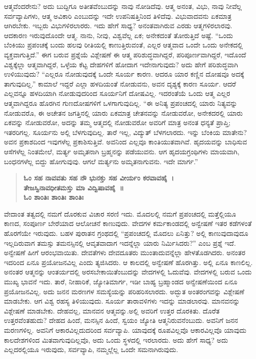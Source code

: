 ಆತ್ಮವೆಂದರೇನು? ಅದು ಬುದ್ದಿಗೂ ಅತೀತವೆಂಬುದನ್ನು ನಾವು ನೋಡಿದೆವು. ಆತ್ಮ ಅನಂತ, ವಿಭು, ನಾವು ನೀವೆಲ್ಲ ಸರ್ವವ್ಯಾಪಿಗಳು, ಆತ್ಮ ಅವಿಕಾರಿ ಎಂಬುದನ್ನು ಇದೇ ಉಪನಿಷತ್ತಿನಿಂದ ತಿಳಿದೆವು. ವಿಭುವಾದವನು ಏಕಮಾತ್ರ ಆಗಿರಬೇಕು. ಇಬ್ಬರು ವಿಭುಗಳಿರಲಾರರು. ಇದು ಹೇಗೆ ಸಾಧ್ಯ? ಅನಂತವಾಗಿರುವ ಎರಡು ಆತ್ಮಗಳಿರಲಾರವು. ಆದಕಾರಣ ಇರುವುದೊಂದೇ ಆತ್ಮ. ನಾನು, ನೀವು, ವಿಶ್ವವೆಲ್ಲ ಏಕ; ಅನೇಕದಂತೆ ತೋರುತ್ತಿದೆ ಅಷ್ಟೆ. “ಒಂದು ಬೆಂಕಿಯು ಪ್ರಪಂಚಕ್ಕೆ ಬಂದು ಹಲವು ರೀತಿಯಲ್ಲಿ ಕಾಣುತ್ತಿರುವಂತೆ, ಎಲ್ಲರ ಆತ್ಮವಾದ ಒಂದೇ ಒಂದು ಅನೇಕದಲ್ಲಿ ವ್ಯಕ್ತವಾಗುತ್ತಿದೆ.” ಈಗ ಬರುವ ಪ್ರಶ್ನೆಯೆ ವಿಶ್ಲೇಷಣೆ ಈ ಆತ್ಮ ಪರಿಶುದ್ಧವಾಗಿದ್ದರೆ, ಪರಿಪೂರ್ಣವಾಗಿದ್ದರೆ, ಇದೊಂದೆ ವಿಶ್ವಕ್ಕೆಲ್ಲಾ ಆತ್ಮವಾಗಿದ್ದರೆ, ಒಳ್ಳೆಯ ಕೆಟ್ಟ ದೇಹಗಳಿಗೆ ಹೋದಾಗ ಇದೇನಾಗುವುದು? ಅದು ಹೇಗೆ ಪರಿಶುದ್ಧವಾಗಿ ಉಳಿಯುವುದು? “ಎಲ್ಲರೂ ನೋಡುವುದಕ್ಕೆ ಒಂದೇ ಸೂರ್ಯ ಕಾರಣ. ಆದರೂ ಯಾರ ಕಣ್ಣಿನ ದೋಷವೂ ಅದಕ್ಕೆ ತಾಗುವುದಿಲ್ಲ.” ಕಾಮಾಲೆ ಇದ್ದರೆ ಎಲ್ಲಾ ಹಳದಿಯಂತೆ ನೋಡುವನು, ಅವನ ದೃಶ್ಯಕ್ಕೆ ಕಾರಣ ಸೂರ್ಯ. ಆದರೆ ಎಲ್ಲವನ್ನೂ ಹಳದಿಯಾಗಿ ನೋಡುವುದರಿಂದ ಸೂರ್ಯನಿಗೆ ದೋಷವಿಲ್ಲ. ಇದರಂತೆಯೆ ಒಂದು ಆತ್ಮ ಎಲ್ಲರ ಆತ್ಮವಾಗಿದ್ದರೂ ಹೊರಗಿನ ಗುಣದೋಷಗಳಿಗೆ ಒಳಗಾಗುವುದಿಲ್ಲ. “ಈ ಅನಿತ್ಯ ಪ್ರಪಂಚದಲ್ಲಿ ಯಾರು ನಿತ್ಯವನ್ನು ನೋಡುವರೊ, ಈ ಅಚೇತನ ಜಗತ್ತಿನಲ್ಲಿ ಯಾರು ಏಕಮಾತ್ರ ಚೇತನವನ್ನು ನೋಡುವರೋ, ಅನೇಕದರಲ್ಲಿ ಯಾರು ಏಕವನ್ನು ನೋಡುವರೋ, ಅದನ್ನು ತಮ್ಮ ಆತ್ಮದಲ್ಲಿ ನೋಡುವರೋ ಅವರಿಗೆ ಮಾತ್ರ ಅನಂತ ಧನ್ಯತೆ ಪ್ರಾಪ್ತಿ; ಇತರರಿಗಲ್ಲ. ಸೂರ್ಯನು ಅಲ್ಲಿ ಬೆಳಗುವುದಿಲ್ಲ. ತಾರೆ ಇಲ್ಲ, ವಿದ್ಯುತ್ ಬೆಳಗಲಾರದು. ಇನ್ನು ಬೆಂಕಿಯ ಮಾತೇನು? ಅವನ ಪ್ರಕಾಶದಿಂದ ಇವುಗಳೆಲ್ಲ ಪ್ರಕಾಶಿಸುತ್ತಿವೆ. ಅವನಿಂದ ಎಲ್ಲವೂ ಕಾಂತಿಯುತವಾಗಿವೆ. ಹೃದಯವನ್ನು ಬಾಧಿಸುವ ಆಸೆಗಳೆಲ್ಲ ನಿಂತಮೇಲೆ, ಮರ್ತ್ಯ ಅಮೃತನಾಗಿ ಬ್ರಹ್ಮನನ್ನು ಪಡೆಯುವನು. ಆಗ ಹೃದಯಗ್ರಂಥಿಗಳು ಮಾಯವಾಗಿ, ಬಂಧನಗಳೆಲ್ಲ ಬಿದ್ದು ಹೋಗುವುವು. ಆಗಲೆ ಮರ್ತ್ಯನು ಅಮೃತನಾಗುವನು. ಇದೇ ಮಾರ್ಗ.”

\begin{verse}
\textbf{ಓಂ ಸಹ ನಾವವತು ಸಹ ನೌ ಭುನಕ್ತು ಸಹ ವೀರ್ಯಂ ಕರವಾವಹೈ~।\\ತೇಜಸ್ವಿನಾವಧೀತಮಸ್ತು ಮಾ ವಿದ್ವಿಷಾವಹೈ~॥\\ಓಂ ಶಾಂತಿಃ ಶಾಂತಿಃ ಶಾಂತಿಃ }
\end{verse}

ವೇದಾಂತ ತತ್ವದಲ್ಲಿ ನಮಗೆ ದೊರಕುವ ವಿಚಾರ ಸರಣಿ ಇದು. ಮೊದಲಲ್ಲಿ ನಮಗೆ ಪ್ರಪಂಚದಲ್ಲಿ ಮತ್ತೆಲ್ಲಿಯೂ ಕಾಣದ, ಸಂಪೂರ್ಣ ಬೇರೆಯಾದ ಆಲೋಚನೆ ಕಾಣುವುದು. ವೇದಗಳ ಕರ್ಮಕಾಂಡದಲ್ಲಿ ಅನ್ವೇಷಣೆ ಇತರ ಕಡೆಗಳಂತೆ ಹೊರಗೆಯೇ ಇರುವುದು. ಬಹಳ ಪುರಾತನ ಗ್ರಂಥದಲ್ಲಿ “ಪ್ರಪಂಚದಲ್ಲಿ ಮೊದಲು ಏನಿತ್ತು? ಅಲ್ಲಿ ಕಾಣುವುದಾವುದೂ ಇಲ್ಲದಿರುವಾಗ ತಮಸ್ಸು ತಮನಸ್ಸಿನಲ್ಲಿ ಆವೃತವಾದಾಗ ಇದನ್ನೆಲ್ಲಾ ಯಾರು ನಿರ್ಮಿಸಿದರು?” ಎಂಬ ಪ್ರಶ್ನೆ ಇದೆ. ಅನ್ವೇಷಣೆ ಹೀಗೆ ಆರಂಭವಾಯಿತು. ದೇವತೆಗಳು ದೇವದೂತರು ಮುಂತಾದುವನ್ನೆಲ್ಲಾ ಹೇಳತೊಡಗಿದರು. ಅನಂತರ ಇದರಿಂದ ಏನೂ ಪ್ರಯೋಜನವಿಲ್ಲ ಎಂದು ತ್ಯಜಿಸಿದರು. ಆ ಕಾಲದಲ್ಲಿ ಅನ್ವೇಷಣೆ ಹೊರಗಿತ್ತು. ಅಲ್ಲಿ ಏನೂ ಕಾಣಲಿಲ್ಲ. ಅನಂತರ ಆತ್ಮನನ್ನು ಆಂತರ್ಯದಲ್ಲಿ ಅರಸಬೇಕಾಯಿತೆಂಬುದನ್ನು ವೇದಗಳಲ್ಲಿ ಓದುವೆವು. ವೇದಗಳಲ್ಲಿ ಬರುವ ಒಂದು ಮುಖ್ಯ ಭಾವನೆ ಇದು. ತಾರೆ, ನೀಹಾರಿಕೆ, ಜ್ಯೋತಿಮಾರ್ಗ, ಇಡೀ ಬಾಹ್ಯ ಬ್ರಹ್ಮಾಂಡದ ಅನ್ವೇಷಣೆಯಿಂದ ಏನೂ ಪ್ರಯೋಜನವಿಲ್ಲ. ಅದು ಜನನ ಮರಣಗಳ ಸಮಸ್ಯೆಯನ್ನು ಪರಿಹರಿಸಲಾರದು. ಅದ್ಭುತ ಅಂತರಂಗವನ್ನು ವಿಶ್ಲೇಷಣೆ ಮಾಡಬೇಕು. ಆಗ ವಿಶ್ವ ರಹಸ್ಯ ತಿಳಿಯುವುದು. ಸೂರ್ಯ ತಾರಾವಳಿಗಳು ಇದನ್ನು ಮಾಡಲಾರವು. ಮಾನವನನ್ನು ವಿಶ್ಲೇಷಣೆ ಮಾಡಬೇಕು. ದೇಹವಲ್ಲ, ಮಾನವನ ಆತ್ಮವನ್ನು.ಅಲ್ಲಿ ಅವರಿಗೆ ಉತ್ತರ ದೊರಕಿತು. ದೊರೆತ ಉತ್ತರವೆಂತಹುದು? ದೇಹದ ಹಿಂದೆ, ಮನಸ್ಸಿನ ಹಿಂದೆ, ಸ್ವಯಂ ಜ್ಯೋತಿ ಆತ್ಮನಿರುವನೆಂಬುದು. ಅವನಿಗೆ ಜನನ ಮರಣಗಳಿಲ್ಲ. ಅವನಿಗೆ ಆಕಾರವಿಲ್ಲದುದರಿಂದ ಸರ್ವವ್ಯಾಪಿ. ಯಾವುದಕ್ಕೆ ರೂಪವಿಲ್ಲವೊ ಆಕಾರವಿಲ್ಲವೊ ಯಾವುದು ಕಾಲದೇಶಗಳಿಂದ ಮಿತವಾಗುವುದಿಲ್ಲವೊ, ಅದು ಒಂದು ಸ್ಥಳದಲ್ಲಿ ಇರಲಾರದು. ಅದು ಹೇಗೆ ಸಾಧ್ಯ? ಅದು ಎಲ್ಲದರಲ್ಲಿಯೂ ಇರುವುದು, ಸರ್ವವ್ಯಾಪಿ, ನಮ್ಮಲ್ಲೆಲ್ಲ ಒಂದೇ ಸಮನಾಗಿರುವುದು.

